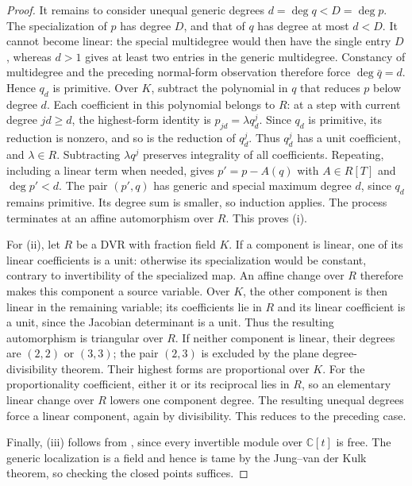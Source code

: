 \documentclass[11pt,reqno]{amsart}
\numberwithin{equation}{section}
\theoremstyle{plain}
\theoremstyle{definition}
\theoremstyle{remark}
\newcommand{\C}{\mathbb C}
\begin{document}
\begin{proof}
It remains to consider unequal generic degrees $d=\deg q<D=\deg p$.
The specialization of $p$ has degree $D$, and that of $q$ has degree
at most $d<D$. It cannot become linear: the special multidegree would
then have the single entry $D$, whereas $d>1$ gives at least two
entries in the generic multidegree. Constancy of multidegree and the
preceding normal-form observation therefore force $\deg\bar q=d$.
Hence $q_d$ is primitive.
Over $K$, subtract the polynomial in $q$ that reduces $p$ below
degree $d$. Each coefficient in this polynomial belongs to $R$:
at a step with current degree $jd\ge d$, the highest-form identity is
$p_{jd}=\lambda q_d^j$. Since $q_d$ is primitive, its reduction is
nonzero, and so is the reduction of $q_d^j$. Thus $q_d^j$ has a unit
coefficient, and $\lambda\in R$. Subtracting $\lambda q^j$ preserves
integrality of all coefficients. Repeating, including a linear term
when needed, gives $p'=p-A(q)$ with $A\in R[T]$ and $\deg p'<d$.
The pair $(p',q)$ has generic and special maximum degree $d$, since
$q_d$ remains primitive. Its degree sum is smaller, so induction
applies. The process terminates at an affine automorphism over $R$.
This proves (i).

For (ii), let $R$ be a DVR with fraction field $K$. If a component is
linear, one of its linear coefficients is a unit: otherwise its
specialization would be constant, contrary to invertibility of the
specialized map. An affine change over $R$ therefore makes this
component a source variable. Over $K$, the other component is then
linear in the remaining variable; its coefficients lie in $R$ and its
linear coefficient is a unit, since the Jacobian determinant is a unit.
Thus the resulting automorphism is triangular over $R$.
If neither component is linear, their degrees are $(2,2)$ or $(3,3)$;
the pair $(2,3)$ is excluded by the plane degree-divisibility theorem.
Their highest forms are proportional over $K$. For the proportionality
coefficient, either it or its reciprocal lies in $R$, so an elementary
linear change over $R$ lowers one component degree. The resulting
unequal degrees force a linear component, again by divisibility.
This reduces to the preceding case.

Finally, (iii) follows from \cite[Theorem 3]{BDFM}, since every invertible
module over $\C[t]$ is free. The generic localization is a field and
hence is tame by the Jung--van der Kulk theorem, so checking the closed
points suffices.
\end{proof}
\end{document}
